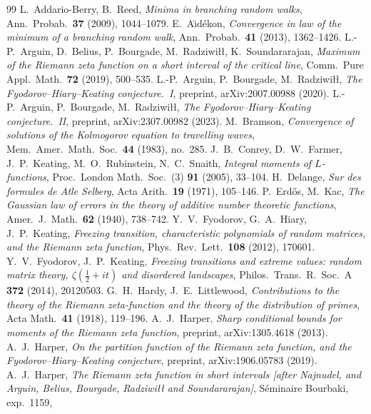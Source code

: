 \documentclass[11pt]{amsart}
\theoremstyle{definition}
\begin{document}
\begin{thebibliography}{99}
 L.~Addario-Berry, B.~Reed, \emph{Minima in branching random walks},
Ann.\ Probab.\ \textbf{37} (2009), 1044--1079.
 E.~A\"{\i}d\'ekon, \emph{Convergence in law of the minimum of a branching random walk},
Ann.\ Probab.\ \textbf{41} (2013), 1362--1426.
 L.-P.~Arguin, D.~Belius, P.~Bourgade, M.~Radziwi{\l}{\l}, K.~Soundararajan,
\emph{Maximum of the Riemann zeta function on a short interval of the critical line},
Comm.\ Pure Appl.\ Math.\ \textbf{72} (2019), 500--535.
 L.-P.~Arguin, P.~Bourgade, M.~Radziwi{\l}{\l},
\emph{The Fyodorov--Hiary--Keating conjecture.~I}, preprint, arXiv:2007.00988 (2020).
 L.-P.~Arguin, P.~Bourgade, M.~Radziwi{\l}{\l},
\emph{The Fyodorov--Hiary--Keating conjecture.~II}, preprint, arXiv:2307.00982 (2023).
 M.~Bramson, \emph{Convergence of solutions of the Kolmogorov equation to travelling waves},
Mem.\ Amer.\ Math.\ Soc.\ \textbf{44} (1983), no.~285.
 J.~B.~Conrey, D.~W.~Farmer, J.~P.~Keating, M.~O.~Rubinstein, N.~C.~Snaith,
\emph{Integral moments of $L$-functions}, Proc.\ London Math.\ Soc.\ (3) \textbf{91} (2005), 33--104.
 H.~Delange, \emph{Sur des formules de Atle Selberg}, Acta Arith.\ \textbf{19} (1971), 105--146.
 P.~Erd\H{o}s, M.~Kac, \emph{The Gaussian law of errors in the theory of additive number
theoretic functions}, Amer.\ J.\ Math.\ \textbf{62} (1940), 738--742.
 Y.~V.~Fyodorov, G.~A.~Hiary, J.~P.~Keating,
\emph{Freezing transition, characteristic polynomials of random matrices, and the Riemann zeta function},
Phys.\ Rev.\ Lett.\ \textbf{108} (2012), 170601.
 Y.~V.~Fyodorov, J.~P.~Keating, \emph{Freezing transitions and extreme values: random matrix theory,
$\zeta(\frac12+it)$ and disordered landscapes}, Philos.\ Trans.\ R.\ Soc.\ A \textbf{372} (2014), 20120503.
 G.~H.~Hardy, J.~E.~Littlewood, \emph{Contributions to the theory of the Riemann zeta-function and
the theory of the distribution of primes}, Acta Math.\ \textbf{41} (1918), 119--196.
 A.~J.~Harper, \emph{Sharp conditional bounds for moments of the Riemann zeta function},
preprint, arXiv:1305.4618 (2013).
 A.~J.~Harper, \emph{On the partition function of the Riemann zeta function, and the
Fyodorov--Hiary--Keating conjecture}, preprint, arXiv:1906.05783 (2019).
 A.~J.~Harper, \emph{The Riemann zeta function in short intervals [after Najnudel, and
Arguin, Belius, Bourgade, Radziwi{\l}{\l} and Soundararajan]}, S\'eminaire Bourbaki, exp.~1159,

\end{thebibliography}
\end{document}
